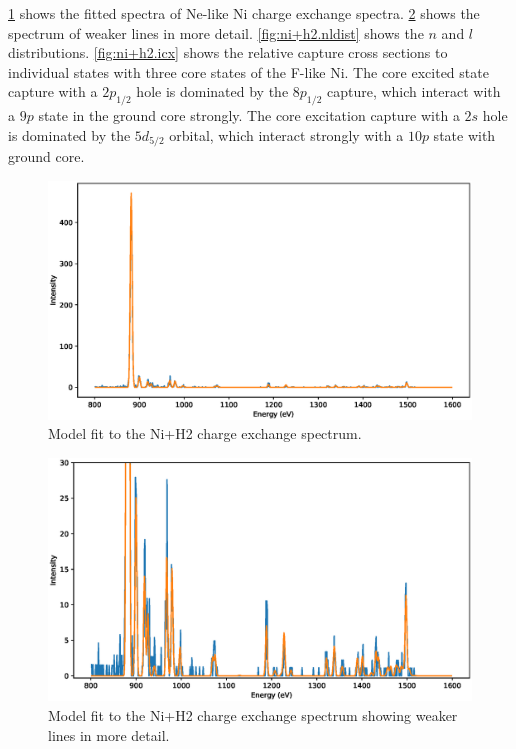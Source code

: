 \documentclass{aastex}
\begin{document}
\ref{fig:ni+h2.spec} shows the fitted spectra of Ne-like Ni charge exchange
spectra. \ref{fig:ni+h2.zoom} shows the spectrum of weaker lines in more
detail. \ref{fig:ni+h2.nldist} shows the $n$ and $l$
distributions. \ref{fig:ni+h2.icx} shows the relative capture cross sections
to individual states with three core states of the F-like Ni. The core excited
state capture with a $2p_{1/2}$ hole is dominated by the $8p_{1/2}$ capture,
which interact with a $9p$ state in the ground core strongly. The core
excitation capture with a $2s$ hole is dominated by the $5d_{5/2}$ orbital,
which interact strongly with a $10p$ state with ground core.
\begin{figure}
  \includegraphics[width=5in]{spec_ni_h2.eps}
  \caption{\label{fig:ni+h2.spec}Model fit to the Ni+H2 charge exchange
    spectrum.}
\end{figure}
\begin{figure}
  \includegraphics[width=5in]{spec_ni_h2_zoom.eps}
  \caption{\label{fig:ni+h2.zoom}Model fit to the Ni+H2 charge exchange
    spectrum showing weaker lines in more detail.}
\end{figure}
\end{document}
